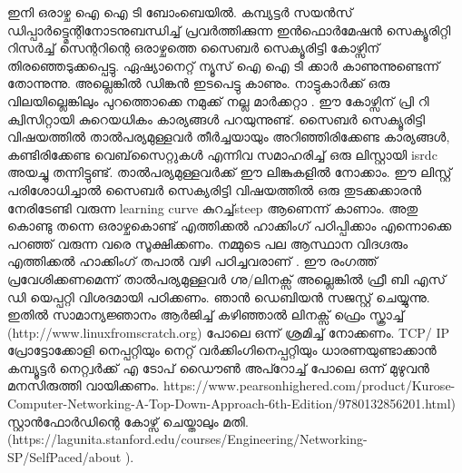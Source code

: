 \documentclass[10pt,a4paper]{report}
\begin{document}
  ഇനി ഒരാഴ്ച ഐ ഐ ടി ബോംബെയിൽ.   കമ്പ്യട്ടർ സയൻസ് ഡിപ്പാർട്ട്മെന്റിനോടനുബന്ധിച്ച് പ്രവർത്തിക്കുന്ന ഇൻഫൊർമേഷൻ സെക്യൂരിറ്റി റിസർച്ച് സെന്ററിന്റെ ഒരാഴ്ചത്തെ സൈബർ സെക്യൂരിട്ടി കോഴ്സിന് തിരഞ്ഞെടുക്കപ്പെട്ടു. ഏഷ്യാനെറ്റ്‌ ന്യൂസ് ഐ ഐ ടി ക്കാർ കാണുന്നുണ്ടെന്ന് തോന്നുന്നു. അല്ലെങ്കിൽ ഡിങ്കൻ ഇടപെട്ടു കാണും. നാട്ടുകാർക്ക് ഒരു വിലയില്ലെങ്കിലും പുറത്തൊക്കെ നമുക്ക് നല്ല മാർക്കറ്റാ . ഈ കോഴ്സിന് പ്രി റി ക്വിസിറ്റായി കുറെയധികം കാര്യങ്ങൾ പറയുന്നുണ്ട്‌. സൈബർ സെക്യൂരിട്ടി വിഷയത്തിൽ താൽപര്യമുള്ളവർ തീർച്ചയായും അറിഞ്ഞിരിക്കേണ്ട കാര്യങ്ങൾ, കണ്ടിരിക്കേണ്ട വെബ്‌സൈറ്റുകൾ എന്നിവ സമാഹരിച്ച് ഒരു ലിസ്റ്റായി isrdc അയച്ചു തന്നിട്ടുണ്ട്. താൽപര്യമുള്ളവർക്ക് ഈ ലിങ്കുകളിൽ നോക്കാം.
   ഈ ലിസ്റ്റ് പരിശോധിച്ചാൽ സൈബർ സെക്യരിട്ടി വിഷയത്തിൽ ഒരു തുടക്കക്കാരൻ നേരിടേണ്ടി വരുന്ന learning curve കുറച്ച്steep ആണെന്ന് കാണാം. അതു കൊണ്ടു തന്നെ ഒരാഴ്ചകൊണ്ട് എത്തിക്കൽ ഹാക്കിംഗ് പഠിപ്പിക്കാം എന്നൊക്കെ പറഞ്ഞ് വരുന്ന വരെ സൂക്ഷിക്കണം. നമ്മുടെ പല ആസ്ഥാന വിദഗ്ദരും എത്തിക്കൽ ഹാക്കിംഗ് തപാൽ വഴി പഠിച്ചവരാണ് . ഈ രംഗത്ത് പ്രവേശിക്കണമെന്ന് താൽപര്യമുള്ളവർ ഗ്നു/ലിനക്സ് അല്ലെങ്കിൽ ഫ്രീ ബി എസ് ഡി യെപ്പറ്റി വിശദമായി പഠിക്കണം. ഞാൻ ഡെബിയൻ സജസ്റ്റ് ചെയ്യുന്നു. ഇതിൽ സാമാന്യജ്ഞാനം ആർജിച്ച് കഴിഞ്ഞാൽ ലിനക്സ് ഫ്രെം സ്ക്രാച്ച് (http://www.linuxfromscratch.org) പോലെ ഒന്ന് ശ്രമിച്ച് നോക്കണം. TCP/ IP പ്രോട്ടോക്കോളി നെപ്പറ്റിയും നെറ്റ് വർക്കിംഗിനെപ്പറ്റിയും ധാരണയുണ്ടാക്കാൻ കമ്പ്യൂട്ടർ നെറ്റ്വർക്ക് എ ടോപ് ഡൈൗൺ അപ്റോച്ച് പോലെ ഒന്ന് മുഴുവൻ മനസിരുത്തി വായിക്കണം. 
    https://www.pearsonhighered.com/product/Kurose-Computer-Networking-A-Top-Down-Approach-6th-Edition/9780132856201.html) സ്റ്റാൻഫോർഡിന്റെ കോഴ്സ് ചെയ്താലും മതി. (https://lagunita.stanford.edu/courses/Engineering/Networking-SP/SelfPaced/about ). %
    
\end{document}
